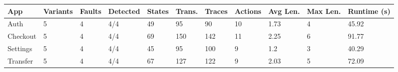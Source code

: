 \begin{tabular}{lllllllllll}
\toprule
App & Variants & Faults & Detected & States & Trans. & Traces & Actions & Avg Len. & Max Len. & Runtime (s) \\
\midrule
Auth & 5 & 4 & 4/4 & 49 & 95 & 90 & 10 & 1.73 & 4 & 45.92 \\
Checkout & 5 & 4 & 4/4 & 69 & 150 & 142 & 11 & 2.25 & 6 & 91.77 \\
Settings & 5 & 4 & 4/4 & 45 & 95 & 100 & 9 & 1.2 & 3 & 40.29 \\
Transfer & 5 & 4 & 4/4 & 67 & 127 & 122 & 9 & 2.03 & 5 & 72.09 \\
\bottomrule
\end{tabular}

